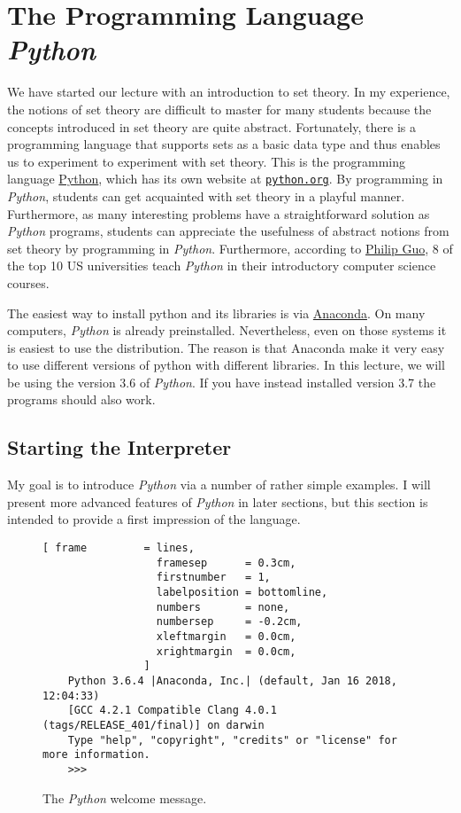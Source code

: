 \chapter{The Programming Language \textsl{Python}}
We have started our lecture with an introduction to set theory.  In my experience, the notions of
set theory are difficult to master for many students because the concepts introduced in set theory
are quite abstract.  Fortunately, there is a programming language that supports sets as a basic data type and
thus enables us to experiment to experiment with set theory.  This is the programming language
\href{https://en.wikipedia.org/wiki/Python_(programming_language)}{Python}, which has its own website at
\href{http://www.python.org}{\texttt{python.org}}.
By programming in \textsl{Python}, students can get acquainted with set theory in a playful manner.
Furthermore, as many interesting problems have a straightforward solution as \textsl{Python} programs,
students can appreciate the usefulness of abstract notions from set theory by programming in \textsl{Python}.
Furthermore, according to 
\href{https://cacm.acm.org/blogs/blog-cacm/176450-python-is-now-the-most-popular-introductory-teaching-language-at-top-u-s-universities/fulltext}{Philip Guo},
8 of the top 10 US universities teach \textsl{Python} in their introductory computer science courses.

The easiest way to install python and its libraries is via \href{https://www.anaconda.com/download/}{Anaconda}.
On many computers, \textsl{Python} is already preinstalled.  Nevertheless, even on those systems it is easiest
to use the  distribution.  The reason is that Anaconda make it very easy to use different
versions of python with different libraries.  In this lecture, we will be using the version 3.6 of \textsl{Python}.
If you have instead installed version 3.7 the programs should also work.

\section{Starting the Interpreter}
My goal is to introduce \textsl{Python} via a number of rather simple examples.  I will present more
advanced features of \textsl{Python} in later sections, but this section is intended to provide a first
impression of the language.


\begin{figure}[!ht]
\centering
\begin{Verbatim}[ frame         = lines, 
                  framesep      = 0.3cm, 
                  firstnumber   = 1,
                  labelposition = bottomline,
                  numbers       = none,
                  numbersep     = -0.2cm,
                  xleftmargin   = 0.0cm,
                  xrightmargin  = 0.0cm,
                ]
    Python 3.6.4 |Anaconda, Inc.| (default, Jan 16 2018, 12:04:33) 
    [GCC 4.2.1 Compatible Clang 4.0.1 (tags/RELEASE_401/final)] on darwin
    Type "help", "copyright", "credits" or "license" for more information.
    >>> 
\end{Verbatim}
\vspace*{-0.3cm}
\caption{The \textsl{Python} welcome message.}
\label{fig:python}
\end{figure}

